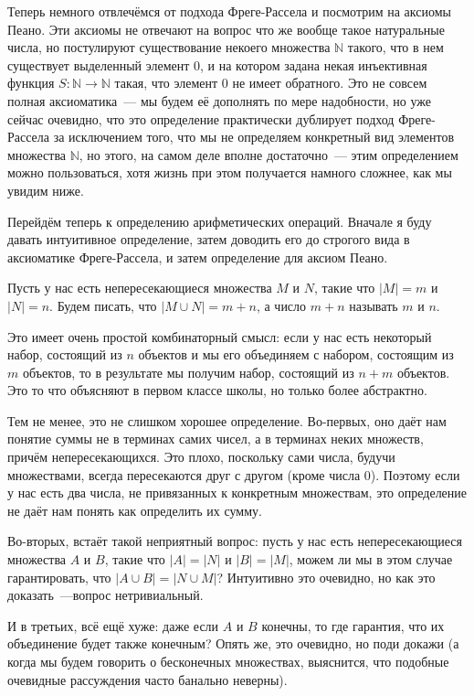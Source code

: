 Теперь немного отвлечёмся от подхода Фреге-Рассела и посмотрим на аксиомы Пеано. Эти аксиомы не отвечают на вопрос что же вообще такое натуральные числа, но постулируют существование некоего множества $\mathbb{N}$ такого, что в нем существует выделенный элемент 0, и на котором задана некая инъективная функция $S:\mathbb{N}\to\mathbb{N}$ такая, что элемент 0 не имеет обратного. Это не совсем полная аксиоматика~--- мы будем её дополнять по мере надобности, но уже сейчас очевидно, что это определение практически дублирует подход Фреге-Рассела за исключением того, что мы не определяем конкретный вид элементов множества $\mathbb{N}$, но этого, на самом деле вполне достаточно~--- этим определением можно пользоваться, хотя жизнь при этом получается намного сложнее, как мы увидим ниже.

Перейдём теперь к определению арифметических операций. Вначале я буду давать интуитивное определение, затем доводить его до строгого вида в аксиоматике Фреге-Рассела, и затем определение для аксиом Пеано.

\begin{definition}
Пусть у нас есть непересекающиеся множества $M$ и $N$, такие что $|M|=m$ и $|N| = n$. Будем писать, что $|M\cup N| = m+n$, а число $m+n$ называть  $m$ и $n$.
\end{definition}

Это имеет очень простой комбинаторный смысл: если у нас есть некоторый набор, состоящий из $n$ объектов и мы его объединяем с набором, состоящим из $m$ объектов, то в результате мы получим набор, состоящий из $n+m$ объектов. Это то что объясняют в первом классе школы, но только более абстрактно.

Тем не менее, это не слишком хорошее определение. Во-первых, оно даёт нам понятие суммы не в терминах самих чисел, а в терминах неких множеств, причём непересекающихся. Это плохо, поскольку сами числа, будучи множествами, всегда пересекаются друг с другом (кроме числа 0). Поэтому если у нас есть два числа, не привязанных к конкретным множествам, это определение не даёт нам понять как определить их сумму.

Во-вторых, встаёт такой неприятный вопрос: пусть у нас есть непересекающиеся множества $A$ и $B$, такие что $|A|=|N|$ и $|B|=|M|$, можем ли мы в этом случае гарантировать, что $|A\cup B| = |N\cup M|$? Интуитивно это очевидно, но как это доказать~---вопрос нетривиальный.

И в третьих, всё ещё хуже: даже если $A$ и $B$ конечны, то где гарантия, что их объединение будет также конечным? Опять же, это очевидно, но поди докажи (а когда мы будем говорить о бесконечных множествах, выяснится, что подобные очевидные рассуждения часто банально неверны).

